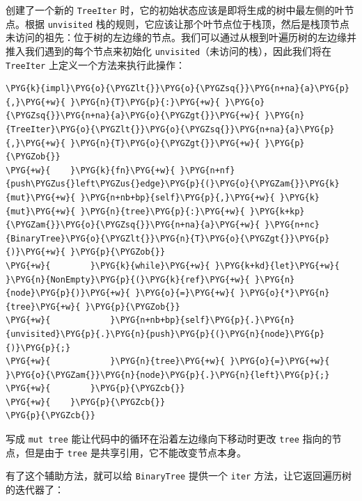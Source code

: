 创建了一个新的 \texttt{TreeIter} 时，它的初始状态应该是即将生成的树中最左侧的叶节点。根据 \texttt{unvisited} 栈的规则，它应该让那个叶节点位于栈顶，然后是栈顶节点未访问的祖先：位于树的左边缘的节点。我们可以通过从根到叶遍历树的左边缘并推入我们遇到的每个节点来初始化 \texttt{unvisited}（未访问的栈），因此我们将在 \texttt{TreeIter} 上定义一个方法来执行此操作：

\begin{Verbatim}[commandchars=\\\{\},breaklines=true,breakanywhere=true,fontsize=\codefont,xleftmargin=17bp]
\PYG{k}{impl}\PYG{o}{\PYGZlt{}}\PYG{o}{\PYGZsq{}}\PYG{n+na}{a}\PYG{p}{,}\PYG{+w}{ }\PYG{n}{T}\PYG{p}{:}\PYG{+w}{ }\PYG{o}{\PYGZsq{}}\PYG{n+na}{a}\PYG{o}{\PYGZgt{}}\PYG{+w}{ }\PYG{n}{TreeIter}\PYG{o}{\PYGZlt{}}\PYG{o}{\PYGZsq{}}\PYG{n+na}{a}\PYG{p}{,}\PYG{+w}{ }\PYG{n}{T}\PYG{o}{\PYGZgt{}}\PYG{+w}{ }\PYG{p}{\PYGZob{}}
\PYG{+w}{    }\PYG{k}{fn}\PYG{+w}{ }\PYG{n+nf}{push\PYGZus{}left\PYGZus{}edge}\PYG{p}{(}\PYG{o}{\PYGZam{}}\PYG{k}{mut}\PYG{+w}{ }\PYG{n+nb+bp}{self}\PYG{p}{,}\PYG{+w}{ }\PYG{k}{mut}\PYG{+w}{ }\PYG{n}{tree}\PYG{p}{:}\PYG{+w}{ }\PYG{k+kp}{\PYGZam{}}\PYG{o}{\PYGZsq{}}\PYG{n+na}{a}\PYG{+w}{ }\PYG{n+nc}{BinaryTree}\PYG{o}{\PYGZlt{}}\PYG{n}{T}\PYG{o}{\PYGZgt{}}\PYG{p}{)}\PYG{+w}{ }\PYG{p}{\PYGZob{}}
\PYG{+w}{        }\PYG{k}{while}\PYG{+w}{ }\PYG{k+kd}{let}\PYG{+w}{ }\PYG{n}{NonEmpty}\PYG{p}{(}\PYG{k}{ref}\PYG{+w}{ }\PYG{n}{node}\PYG{p}{)}\PYG{+w}{ }\PYG{o}{=}\PYG{+w}{ }\PYG{o}{*}\PYG{n}{tree}\PYG{+w}{ }\PYG{p}{\PYGZob{}}
\PYG{+w}{            }\PYG{n+nb+bp}{self}\PYG{p}{.}\PYG{n}{unvisited}\PYG{p}{.}\PYG{n}{push}\PYG{p}{(}\PYG{n}{node}\PYG{p}{)}\PYG{p}{;}
\PYG{+w}{            }\PYG{n}{tree}\PYG{+w}{ }\PYG{o}{=}\PYG{+w}{ }\PYG{o}{\PYGZam{}}\PYG{n}{node}\PYG{p}{.}\PYG{n}{left}\PYG{p}{;}
\PYG{+w}{        }\PYG{p}{\PYGZcb{}}
\PYG{+w}{    }\PYG{p}{\PYGZcb{}}
\PYG{p}{\PYGZcb{}}
\end{Verbatim}

写成 \texttt{mut tree} 能让代码中的循环在沿着左边缘向下移动时更改 \texttt{tree} 指向的节点，但是由于 \texttt{tree} 是共享引用，它不能改变节点本身。

有了这个辅助方法，就可以给 \texttt{BinaryTree} 提供一个 \texttt{iter} 方法，让它返回遍历树的迭代器了：


